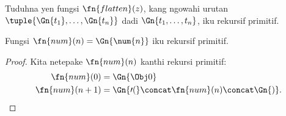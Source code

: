 \documentclass[../../../include/open-logic-section]{subfiles}
\begin{document}
\begin{prob}
Tuduhna yen fungsi $\fn{flatten}(z)$,
kang ngowahi urutan
$\tuple{\Gn{t_1}, \dots, \Gn{t_n}}$
dadi $\Gn{t_1, \dots, t_n}$,
iku rekursif primitif.
\end{prob}

\begin{prop}
  Fungsi $\fn{num}(n) = \Gn{\num{n}}$
  iku rekursif primitif.
\end{prop}

\begin{proof}
  Kita netepake $\fn{num}(n)$
  kanthi rekursi primitif:
  \begin{align*}
    \fn{num}(0) & = \Gn{\Obj 0}\\
    \fn{num}(n+1) & = \Gn{\prime(} \concat \fn{num}(n) \concat \Gn{)}.
  \end{align*}
\end{proof}
\end{document}
